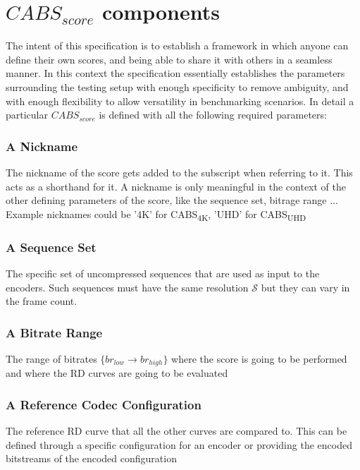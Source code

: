 \documentclass[10pt, conference, hidelinks, onecolumn]{IEEEtran}
\begin{document}
\section{$CABS_{score}$ components}
The intent of this specification is to establish a framework in which anyone can define their own scores, and being able to share it with others in a seamless manner. In this context the specification essentially establishes the parameters surrounding the testing setup with enough specificity to remove ambiguity, and with enough flexibility to allow versatility in benchmarking scenarios. In detail a particular $CABS_{score}$ is defined with all the following required parameters:

\subsubsection{A Nickname}
\label{subsec:nickname}
The nickname of the score gets added to the subscript when referring to it. This acts as a shorthand for it. A nickname is only meaningful in the context of the other defining parameters of the score, like the sequence set, bitrage range ... Example nicknames could be '4K' for CABS\textsubscript{4K}, 'UHD' for CABS\textsubscript{UHD}


\subsubsection{A Sequence Set}
\label{subsec:sequenceset}
The specific set of uncompressed sequences that are used as input to the encoders. Such sequences must have the same resolution $\mathcal{S}$ but they can vary in the frame count.


\subsubsection{A Bitrate Range}
\label{subsec:bitraterange}
The range of bitrates $\lbrace br_{low} \to br_{high} \rbrace $ where the score is going to be performed and where the RD curves are going to be evaluated


\subsubsection{A Reference Codec Configuration}
\label{subsec:refcodecconfig}
The reference RD curve that all the other curves are compared to. This can be defined through a specific configuration for an encoder or providing the encoded bitstreams of the encoded configuration
\end{document}
